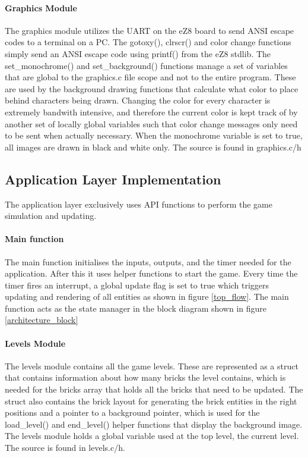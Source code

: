 \paragraph{Graphics Module}
The graphics module utilizes the UART on the eZ8 board to send ANSI escape codes to a terminal on a PC.
The gotoxy(), clrscr() and color change functions simply send an ANSI escape code using printf() from 
the eZ8 stdlib. The set\_monochrome() and set\_background() functions manage a set of variables
that are global to the graphics.c file scope and not to the entire program. These are used by
the background drawing functions that calculate what color to place behind characters being drawn.
Changing the color for every character is extremely bandwith intensive, and therefore the current
color is kept track of by another set of locally global variables such that color change messages
only need to be sent when actually necessary. When the monochrome variable is set to true, all
images are drawn in black and white only. The source is found in graphics.c/h  

\subsection{Application Layer Implementation}
The application layer exclusively uses API functions to perform the game simulation and updating.

\paragraph{Main function}
The main function initialises the inputs, outputs, and the timer needed for the application. After this
it uses helper functions to start the game. Every time the timer fires an interrupt, a global update flag
is set to true which triggers updating and rendering of all entities as shown in figure \ref{top_flow}.
The main function acts as the state manager in the block diagram shown in figure \ref{architecture_block}

\paragraph{Levels Module}
The levels module contains all the game levels. These are represented as a struct that contains
information about how many bricks the level contains, which is needed for the bricks array
that holds all the bricks that need to be updated. The struct also contains the brick layout
for generating the brick entities in the right positions and a pointer to a background pointer, 
which is used for the load\_level() and end\_level() helper functions that display the background
image. The levels module holds a global variable used at the top level, the current level. The source
is found in levels.c/h.


